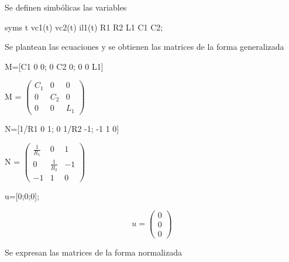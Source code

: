 \documentclass[10pt,a4paper]{article} %
\begin{document}
	\begin{par}
		\begin{flushleft}
			Se definen simbólicas las variables
		\end{flushleft}
	\end{par}
	
	\begin{matlabcode}
		syms t vc1(t) vc2(t) il1(t) R1 R2 L1 C1 C2;
	\end{matlabcode}
	
	\begin{par}
		\begin{flushleft}
			Se plantean las ecuaciones y se obtienen las matrices de la forma generalizada
		\end{flushleft}
	\end{par}
	
	\begin{matlabcode}
		M=[C1 0 0; 0 C2 0; 0 0 L1]
	\end{matlabcode}
	\begin{matlabsymbolicoutput}
		M = 
		$\displaystyle \left(\begin{array}{ccc}
		C_1  & 0 & 0\\
		0 & C_2  & 0\\
		0 & 0 & L_1 
		\end{array}\right)$
	\end{matlabsymbolicoutput}
	\begin{matlabcode}
		N=[1/R1 0 1; 0 1/R2 -1; -1 1 0]
	\end{matlabcode}
	\begin{matlabsymbolicoutput}
		N = 
		$\displaystyle \left(\begin{array}{ccc}
		\frac{1}{R_1 } & 0 & 1\\
		0 & \frac{1}{R_2 } & -1\\
		-1 & 1 & 0
		\end{array}\right)$
	\end{matlabsymbolicoutput}
	\begin{matlabcode}
		u=[0;0;0]; 
	\end{matlabcode}
	
	\begin{par}
		$$u=\begin{pmatrix}
		0\\0\\0
		\end{pmatrix}$$
	\end{par}
	
	\begin{par}
		\begin{flushleft}
			Se expresan las matrices de la forma normalizada
		\end{flushleft}
	\end{par}
	
\end{document}
